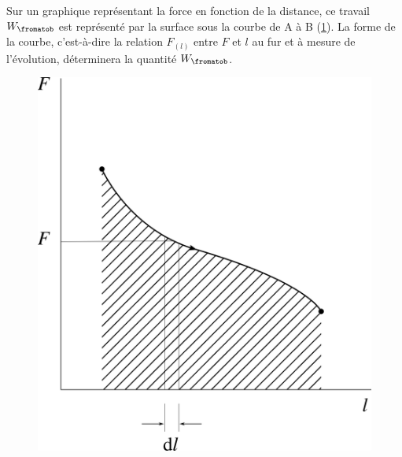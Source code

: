 	Sur un graphique représentant la force en fonction de la distance, ce travail $W_\fromatob$ est représenté par la surface sous la courbe de A à B (\cref{fig_force-déplacement-aire}). La forme de la courbe, c’est-à-dire la relation $F_{(l)}$ entre $F$ et $l$ au fur et à mesure de l’évolution, déterminera la quantité $W_\fromatob$.
	
	\begin{figure}
	\begin{center}
		\includegraphics[width=\didacticpvdiagramwidth]{images/fl.png}
	\end{center}
	\label{fig_force-déplacement-aire}
	\end{figure}

